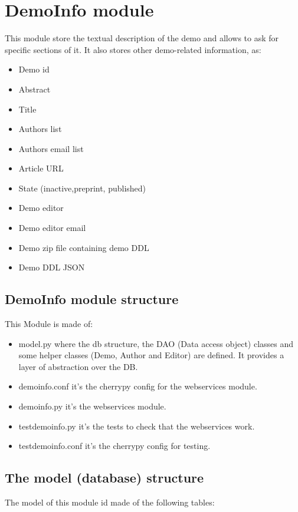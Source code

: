 \section{DemoInfo module}
This module store the textual description of the demo and allows to ask for specific sections of it. It also stores other demo-related information, as:
\begin{itemize}
\item Demo id
\item Abstract
\item Title 
\item Authors list
\item Authors email list
\item Article URL
\item State (inactive,preprint, published)
\item Demo editor
\item Demo editor email
\item Demo zip file containing demo DDL 
\item Demo DDL JSON
\end{itemize}

\subsection{DemoInfo module structure}
This Module is made of:
\begin{itemize}
\item model.py where the db structure, the DAO (Data access object) classes and some helper classes (Demo, Author and Editor) are defined. It provides a layer of abstraction over the DB.
\item demoinfo.conf it's the cherrypy config for the webservices module.
\item demoinfo.py it's the webservices module.
\item testdemoinfo.py it's the tests to check that the webservices work.
\item testdemoinfo.conf it's the cherrypy config for testing.
\end{itemize}

\subsection{The model (database) structure}
The model of this module id made of the following tables:

